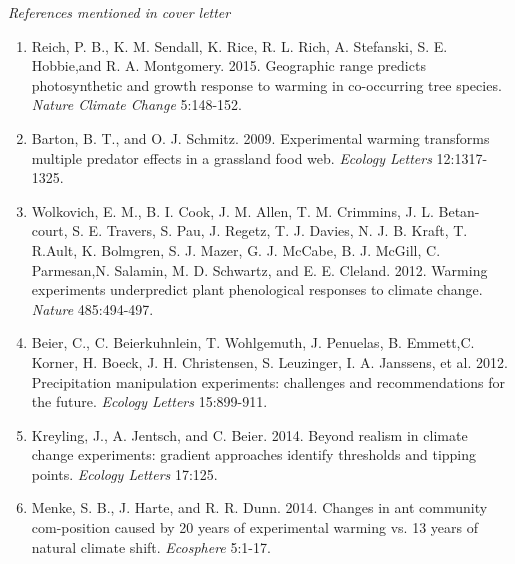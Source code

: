 \documentclass[11pt,a4paper]{letter}
\begin{document}
\begin{letter}{}
\noindent \emph{References mentioned in cover letter}
\begin{footnotesize}
\begin{enumerate}
\item Reich,  P. B.,  K. M. Sendall,  K. Rice,  R. L. Rich,  A. Stefanski,  S. E. Hobbie,and R. A. Montgomery. 2015.  Geographic range predicts photosynthetic and growth response to warming in co-occurring tree species.  \emph{Nature Climate Change} 5:148-152.
\item Barton,  B.  T.,  and  O.  J.  Schmitz.  2009.   Experimental  warming  transforms multiple predator effects in a grassland food web.   \emph{Ecology Letters} 12:1317-1325.
\item Wolkovich,  E.  M.,  B.  I.  Cook,  J.  M.  Allen,  T.  M.  Crimmins,  J.  L.  Betan-court, S. E. Travers, S. Pau, J. Regetz, T. J. Davies, N. J. B. Kraft, T. R.Ault, K. Bolmgren, S. J. Mazer, G. J. McCabe, B. J. McGill, C. Parmesan,N. Salamin, M. D. Schwartz, and E. E. Cleland. 2012.  Warming experiments underpredict plant phenological responses to climate change.  \emph{Nature} 485:494-497.
\item Beier,   C.,   C.   Beierkuhnlein,   T.   Wohlgemuth,   J.   Penuelas,   B.   Emmett,C. Korner, H. Boeck, J. H. Christensen, S. Leuzinger, I. A. Janssens, et al. 2012.  Precipitation manipulation experiments: challenges and recommendations for the future.  \emph{Ecology Letters} 15:899-911.
\item Kreyling, J., A. Jentsch, and C. Beier. 2014.  Beyond realism in climate change experiments: gradient  approaches  identify  thresholds  and  tipping  points. \emph{Ecology Letters} 17:125.
\item Menke, S. B., J. Harte, and R. R. Dunn. 2014. Changes in ant community com-position caused by 20 years of experimental warming vs. 13 years of natural climate shift.  \emph{Ecosphere} 5:1-17.

\end{enumerate}
\end{footnotesize}



\end{letter}
\end{document}
